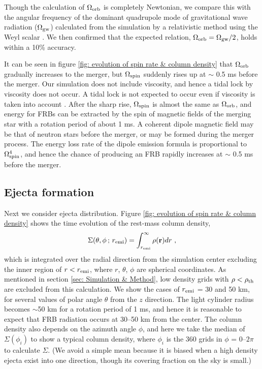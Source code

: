 \documentclass[]{pasj01}
\begin{document}
Though the calculation of $\Omega_{\rm orb}$ is completely Newtonian,
we compare this with the angular frequency of the dominant quadrupole
mode of gravitational wave radiation ($\Omega_{\rm gw}$) calculated
from the simulation by a relativistic method using the Weyl scalar
\citep{Yamamoto2008}.  We then confirmed that the expected relation,
$\Omega_{\rm orb} = \Omega_{\rm gw}/2$, holds within a 10\% accuracy.

It can be seen in figure \ref{fig: evolution of spin rate & column
  density} that $\Omega_{\rm orb}$ gradually increases to the merger,
but $\Omega_{\rm spin}$ suddenly rises up at $\sim$ 0.5 ms before the
merger. Our simulation does not include viscosity, and hence a tidal
lock by viscosity does not occur. A tidal lock is not expected to
occur even if viscosity is taken into account \citep{Bildsten1992}.
After the sharp rise, $\Omega_{\rm spin}$ is almost the same as
$\Omega_{\rm orb}$, and energy for FRBs can be extracted by the spin
of magnetic fields of the merging star with a rotation period of about
1 ms. A coherent dipole magnetic field may be that of neutron stars
before the merger, or may be formed during the merger process.  The
energy loss rate of the dipole emission formula is proportional to
$\Omega_{\rm spin}^4$, and hence the chance of producing an FRB
rapidly increases at $\sim$ 0.5 ms before the merger.


\subsection{Ejecta formation}

Next we consider ejecta distribution. Figure \ref{fig: evolution of spin rate & column density} shows the time evolution of the
rest-mass column density,
\begin{eqnarray}
\Sigma(\theta, \phi \, ; \, r_{\rm emi})
= \int_{r_{\rm emi}}^\infty \rho({\bf r}) dr \ , 
\end{eqnarray}
which is integrated over the radial direction from the simulation
center excluding the inner region of $r < r_{\rm emi}$, where $r$,
$\theta$, $\phi$ are spherical coordinates.  As mentioned in section
\ref{sec: Simulation & Method}, low density grids with $\rho <
\rho_{\rm th}$ are excluded from this calculation.  We show the cases
of $r_{\rm emi}$ = 30 and 50 km, for several values of polar angle
$\theta$ from the $z$ direction. The light cylinder radius becomes
$\sim$50 km for a rotation period of 1 ms, and hence it is reasonable
to expect that FRB radiation occurs at 30--50 km from the center.  The
column density also depends on the azimuth angle $\phi$, and here we
take the median of $\Sigma(\phi_i)$ to show a typical column density,
where $\phi_i$ is the 360 grids in $\phi$ = 0--$2\pi$ to calculate
$\Sigma$.  (We avoid a simple mean because it is biased when a high
density ejecta exist into one direction, though its covering fraction
on the sky is small.)
\end{document}
